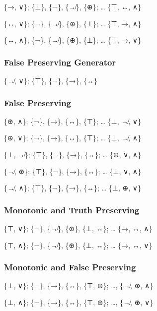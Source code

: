 \{→, ∨\}; \{⊥\}, \{¬\}, \{↛\}, \{⊕\}; \ldots{} \{⊤, ↔, ∧\}

\{↔, ∨\}; \{¬\}, \{↛\}, \{⊕\}, \{⊥\}; \ldots{} \{⊤, →, ∧\}

\{↔, ∧\}; \{¬\}, \{↛\}, \{⊕\}, \{⊥\}; \ldots{} \{⊤, →, ∨\}

\hypertarget{false-preserving-generator}{%
\subsubsection{False Preserving
Generator}\label{false-preserving-generator}}

\{↛, ∨\}; \{⊤\}, \{¬\}, \{→\}, \{↔\}

\hypertarget{false-preserving}{%
\subsubsection{False Preserving}\label{false-preserving}}

\{⊕, ∧\}; \{¬\}, \{→\}, \{↔\}, \{⊤\}; \ldots{} \{⊥, ↛, ∨\}

\{⊕, ∨\}; \{¬\}, \{→\}, \{↔\}, \{⊤\}; \ldots{} \{⊥, ↛, ∧\}

\{⊥, ↛\}; \{⊤\}, \{¬\}, \{→\}, \{↔\}; \ldots{} \{⊕, ∨, ∧\}

\{↛, ⊕\}; \{⊤\}, \{¬\}, \{→\}, \{↔\}; \ldots{} \{⊥, ∨, ∧\}

\{↛, ∧\}; \{⊤\}, \{¬\}, \{→\}, \{↔\}; \ldots{} \{⊥, ⊕, ∨\}

\hypertarget{monotonic-and-truth-preserving}{%
\subsubsection{Monotonic and Truth
Preserving}\label{monotonic-and-truth-preserving}}

\{⊤, ∨\}; \{¬\}, \{↛\}, \{⊕\}, \{⊥, ↔\}; \ldots{} \{→, ↔, ∧\}

\{⊤, ∧\}; \{¬\}, \{↛\}, \{⊕\}, \{⊥, ↔\}; \ldots{} \{→, ↔, ∨\}

\hypertarget{monotonic-and-false-preserving}{%
\subsubsection{Monotonic and False
Preserving}\label{monotonic-and-false-preserving}}

\{⊥, ∨\}; \{¬\}, \{→\}, \{↔\}, \{⊤, ⊕\}; \ldots, \{↛, ⊕, ∧\}

\{⊥, ∧\}; \{¬\}, \{→\}, \{↔\}, \{⊤, ⊕\}; \ldots, \{↛, ⊕, ∨\}

\hypertarget{section}{%
\subsubsection{}\label{section}}

